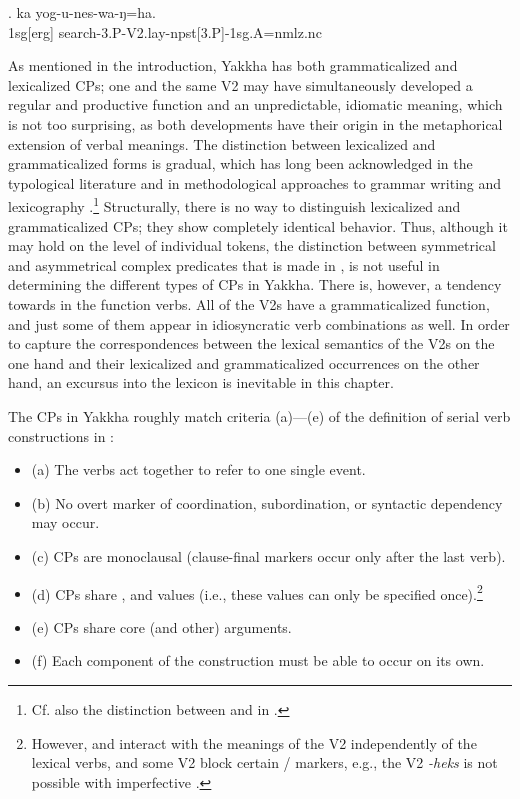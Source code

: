 \exg. ka yog-u-nes-wa-ŋ=ha.\\ 
{\sc 1sg[erg]} search{\sc -3.P-V2.lay-npst[3.P]-1sg.A=nmlz.nc}\\ 
	 


 As mentioned in the introduction, Yakkha has both grammaticalized and lexicalized CPs; one and the same V2 may have simultaneously developed a regular and productive function and an unpredictable, idiomatic meaning, which is not too surprising, as both developments have their origin in the metaphorical extension of verbal meanings. The distinction between lexicalized and grammaticalized forms is gradual, which has long been acknowledged in the typological literature  \citep{Lehmann2002_Thoughts, Diewald2010_Some, Lichtenberk1991_Gradualness, Himmelmann2004_Lexicalization} and in methodological approaches to grammar writing and lexicography \citep{Schultze-Berndt2006_Taking, Mosel2006_Grammaticography, Enfield2006_Heterosemy}.\footnote{Cf. also the distinction between  and  in \citet{Svensen2009_Handbook}.} Structurally, there is no way to distinguish lexicalized and grammaticalized CPs; they show completely identical behavior. Thus, although it may hold on the level of individual tokens, the distinction between symmetrical and asymmetrical complex predicates that is made in \citet{Aikhenvald2006_Serial},  is not useful in determining the different types of CPs in Yakkha. There is, however, a tendency towards  in the function verbs. All of the V2s have a grammaticalized function, and just some of them appear in idiosyncratic verb combinations as well. In order to capture the correspondences between the lexical semantics of the V2s on the one hand and their lexicalized and grammaticalized occurrences on the other hand, an excursus into the lexicon is inevitable in this chapter. 
 
The CPs in Yakkha roughly match criteria (a)—(e) of the definition of serial verb constructions in \citet[1]{Aikhenvald2006_Serial}: 


\begin{itemize}
\item (a) The verbs act together to refer to one single event.
\item (b) No overt marker of coordination, subordination, or syntactic dependency may occur.
\item (c) CPs are monoclausal (clause-final markers occur only after the last verb).
\item (d) CPs share ,  and  values (i.e., these values can only be specified once).\footnote{However,  and  interact with the meanings of the V2 independently of the lexical verbs, and some V2 block certain / markers, e.g., the  V2 \emph{-heks}  is not possible with imperfective .}
\item (e) CPs share core (and other) arguments.
\item (f) Each component of the construction must be able to occur on its own.
\end{itemize}



